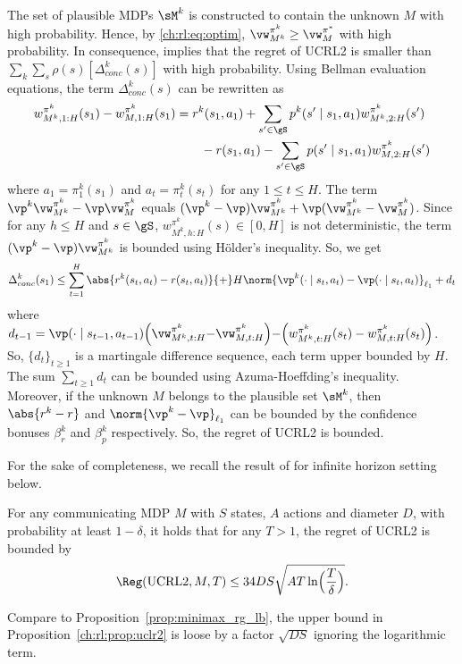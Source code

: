 The set of plausible MDPs $\sM^k$ is constructed to contain the unknown $M$ with high probability.
Hence, by \eqref{ch:rl:eq:optim}, $\vw^{\pi^k}_{M^k}\ge \vw^{\pi^*}_M$ with high probability. 
In consequence,  implies that the regret of UCRL2 is smaller than ${\sum_{k}\sum_{s}\rho(s)[\Delta_{conc}^k(s)]}$ with high probability.
Using Bellman evaluation equations, the term $\Delta_{conc}^k(s)$ can be rewritten as
\begin{align}
    w^{\pi^k}_{M^k,1:H}(s_1) -w^{\pi^k}_{M,1:H}(s_1)
    &= r^k(s_1,a_1)+\sum_{s'\in\gS}p^k(s'\mid s_1,a_1)w^{\pi^k}_{M^k,2:H}(s') \nonumber\\
    &\qquad -r(s_1,a_1)-\sum_{s'\in\gS}p(s'\mid s_1,a_1)w^{\pi^k}_{M,2:H}(s') \label{eq:decom}
\end{align}
where $a_1=\pi^k_1(s_1)$ and $a_t=\pi^k_t(s_t)$ for any $1\le t\le H$.
The term $\vp^k\vw^{\pi^k}_{M^k}-\vp\vw^{\pi^k}_M$ equals $(\vp^k-\vp)\vw^{\pi^k}_{M^k} +\vp(\vw^{\pi^k}_{M^k}-\vw^{\pi^k}_M)$.
Since for any $h\le H$ and $s\in\gS$, $w^{\pi^k}_{M^k,h:H}(s)\in [0,H]$ is not deterministic, the term $(\vp^k-\vp)\vw^{\pi^k}_{M^k}$ is bounded using Hölder's inequality.
So, we get
\begin{equation}
    \label{ch:rl:eq:delta_conc}
    \Delta_{conc}^k(s_1)\le\sum_{t=1}^{H} \abs{r^k(s_t,a_t)-r(s_t,a_t)}{+}H\norm{\vp^k(\cdot\mid s_t,a_t)-\vp(\cdot\mid s_t,a_t)}_{\ell_1} +d_t
\end{equation}
where $d_{t-1}=\vp(\cdot\mid s_{t{-}1},a_{t{-}1})\Bigl(\vw^{\pi^k}_{M^k,t:H} {-}\vw^{\pi^k}_{M,t:H}\Bigr) {-}\Bigl(w^{\pi^k}_{M^k,t:H}(s_{t}) -w^{\pi^k}_{M,t:H}(s_{t})\Bigr)$.
So, $\{d_t\}_{t\ge 1}$ is a martingale difference sequence, each term upper bounded by $H$.
The sum $\sum_{t\ge1}d_t$ can be bounded using Azuma-Hoeffding's inequality.
Moreover, if the unknown $M$ belongs to the plausible set $\sM^k$, then $\abs{r^k-r}$ and $\norm{\vp^k-\vp}_{\ell_1}$ can be bounded by the confidence bonuses $\beta_r^k$ and $\beta_p^k$ respectively.
So, the regret of UCRL2 is bounded.

For the sake of completeness, we recall the result of \cite{jaksch2010near} for infinite horizon setting below.
\begin{prop}
    \label{ch:rl:prop:uclr2}
    For any communicating MDP $M$ with $S$ states, $A$ actions and diameter $D$, with probability at least $1-\delta$, it holds that for any $T>1$, the regret of UCRL2 is bounded by
    \begin{align*}
        \Reg(\textnormal{UCRL2}, M, T) \le 34DS\sqrt{AT\ln\Bigl(\frac{T}{\delta}\Bigr)}.
    \end{align*}
\end{prop}
Compare to Proposition~\ref{prop:minimax_rg_lb}, the upper bound in Proposition~\ref{ch:rl:prop:uclr2} is loose by a factor $\sqrt{DS}$ ignoring the logarithmic term.

